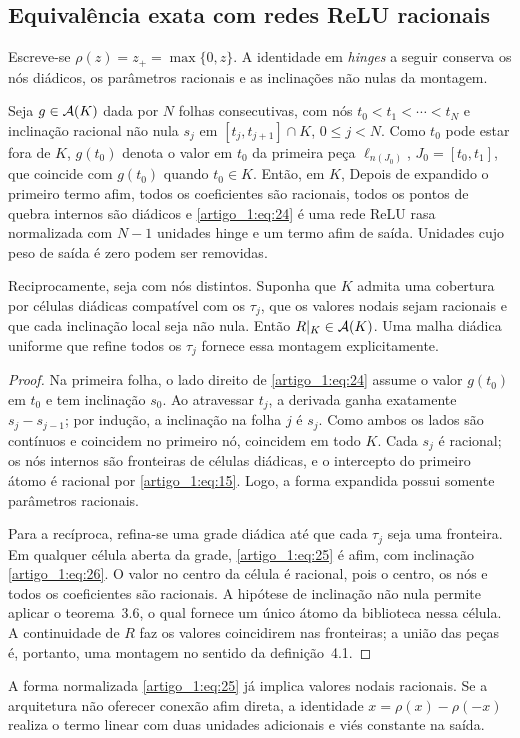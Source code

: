 \subsection{Equivalência exata com redes ReLU racionais}
Escreve-se $\rho(z)=z_+=\max\{0,z\}$. A identidade em \emph{hinges} a seguir conserva os nós diádicos, os parâmetros racionais e as inclinações não nulas da montagem.
\begin{teorema}\label{map:artigo_1:4.3}
Seja $g\in\mathcal A(K)$ dada por $N$ folhas consecutivas, com nós $t_0<t_1<\cdots<t_N$ e inclinação racional não nula $s_j$ em $[t_j,t_{j+1}]\cap K$, $0\le j<N$. Como $t_0$ pode estar fora de $K$, $g(t_0)$ denota o valor em $t_0$ da primeira peça $\ell_{n(J_0)}$, $J_0=[t_0,t_1]$, que coincide com $g(t_0)$ quando $t_0\in K$. Então, em $K$,
Depois de expandido o primeiro termo afim, todos os coeficientes são racionais, todos os pontos de quebra internos são diádicos e \eqref{artigo_1:eq:24} é uma rede ReLU rasa normalizada com $N-1$ unidades hinge e um termo afim de saída. Unidades cujo peso de saída é zero podem ser removidas.

Reciprocamente, seja
com nós distintos. Suponha que $K$ admita uma cobertura por células diádicas compatível com os $\tau_j$, que os valores nodais sejam racionais e que cada inclinação local
seja não nula. Então $R|_K\in\mathcal A(K)$. Uma malha diádica uniforme que refine todos os $\tau_j$ fornece essa montagem explicitamente.
\end{teorema}
\begin{proof}
Na primeira folha, o lado direito de \eqref{artigo_1:eq:24} assume o valor $g(t_0)$ em $t_0$ e tem inclinação $s_0$. Ao atravessar $t_j$, a derivada ganha exatamente $s_j-s_{j-1}$; por indução, a inclinação na folha $j$ é $s_j$. Como ambos os lados são contínuos e coincidem no primeiro nó, coincidem em todo $K$. Cada $s_j$ é racional; os nós internos são fronteiras de células diádicas, e o intercepto do primeiro átomo é racional por \eqref{artigo_1:eq:15}. Logo, a forma expandida possui somente parâmetros racionais.

Para a recíproca, refina-se uma grade diádica até que cada $\tau_j$ seja uma fronteira. Em qualquer célula aberta da grade, \eqref{artigo_1:eq:25} é afim, com inclinação \eqref{artigo_1:eq:26}. O valor no centro da célula é racional, pois o centro, os nós e todos os coeficientes são racionais. A hipótese de inclinação não nula permite aplicar o teorema~3.6, o qual fornece um único átomo da biblioteca nessa célula. A continuidade de $R$ faz os valores coincidirem nas fronteiras; a união das peças é, portanto, uma montagem no sentido da definição~4.1.
\end{proof}
A forma normalizada \eqref{artigo_1:eq:25} já implica valores nodais racionais. Se a arquitetura não oferecer conexão afim direta, a identidade $x=\rho(x)-\rho(-x)$ realiza o termo linear com duas unidades adicionais e viés constante na saída.

